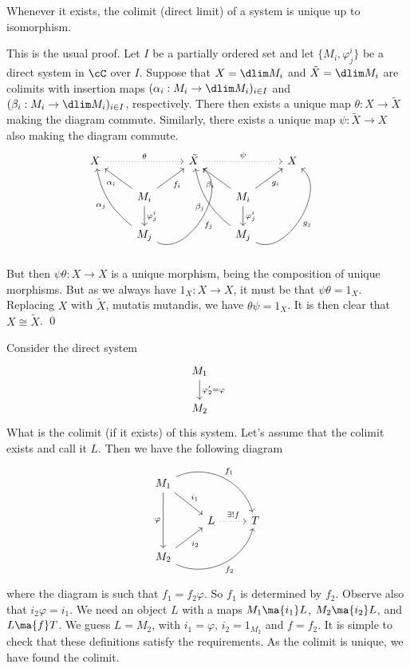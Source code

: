 \begin{prop}
Whenever it exists, the colimit (direct limit) of a system is unique up to isomorphism.
\end{prop}

\pf This is the usual proof. Let $I$ be a partially ordered set and let $\{M_i,\varphi^i_j\}$ be a direct system in $\cC$ over $I$. Suppose that $X= \dlim M_i$ and $\tilde{X}= \dlim M_i$ are colimits with insertion maps $(\alpha_i: M_i \to \dlim M_i)_{i \in I}$ and $(\beta_i: M_i \to \dlim M_i)_{i \in I}$, respectively. There then exists a unique map $\theta: X \to \tilde{X}$ making the diagram commute. Similarly, there exists a unique map $\psi: \tilde{X} \to X$ also making the diagram commute.
		\[
		\begin{tikzcd}
		X \arrow[dotted]{rr}{\theta} & & \tilde{X} \arrow[dotted]{rr}{\psi} & & X \\
		& M_i \arrow{ul}{\alpha_i} \arrow[swap]{ur}{f_i} \arrow{d}{\varphi_j^i} & & M_i \arrow{ul}{\beta_i} \arrow[swap]{ur}{g_i} \arrow{d}{\varphi_j^i} & \\
		& \arrow[bend left = 20]{uul}{\alpha_j} M_j  \arrow[bend right=20ex,swap]{uur}{f_j} & & \arrow[bend left = 20]{uul}{\beta_j} M_j  \arrow[bend right=20ex,swap]{uur}{g_j} & 
		\end{tikzcd}
		\]
But then $\psi\theta: X \to X$ is a unique morphism, being the composition of unique morphisms. But as we always have $1_X: X \to X$, it must be that $\psi\theta=1_X$. Replacing $X$ with $\tilde{X}$, mutatis mutandis, we have $\theta\psi=1_X$. It is then clear that $X \cong \tilde{X}$. \qed \\


\begin{ex}
Consider the direct system
	\[
	\begin{tikzcd}
	M_1 \arrow{d}{\varphi_2'=\varphi} \\
	M_2
	\end{tikzcd}
	\]
What is the colimit (if it exists) of this system. Let's assume that the colimit exists and call it $L$. Then we have the following diagram 
	\[
	\begin{tikzcd}
	M_1 \arrow[bend left=50]{rrd}{f_1} \arrow{dr}{i_1} \arrow[swap]{dd}{\varphi} & & \\
	& L \arrow[dotted]{r}{\exists! f} & T  \\
	M_2 \arrow[swap]{ur}{i_2} \arrow[bend right=50,swap]{rru}{f_2} & & 
	\end{tikzcd}
	\]
where the diagram is such that $f_1=f_2\varphi$. So $f_1$ is determined by $f_2$. Observe also that $i_2 \varphi=i_1$. We need an object $L$ with a maps $M_1 \ma{i_1} L$, $M_2 \ma{i_2} L$, and $L \ma{f} T$. We guess $L=M_2$, with $i_1=\varphi$, $i_2=1_{M_2}$ and $f=f_2$. It is simple to check that these definitions satisfy the requirements. As the colimit is unique, we have found the colimit. \xqed
\end{ex}


